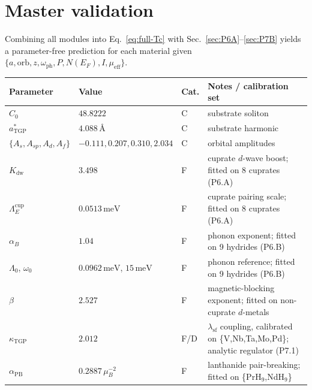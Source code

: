 \documentclass[11pt,a4paper]{article}
\newcommand{\lamsf}{\lambda_{\mathrm{sf}}}
\newcommand{\meV}{\,\mathrm{meV}}
\newcommand{\LamE}{\Lambda_{E}}
\begin{document}
\section{Master validation}\label{sec:master}

Combining all modules into Eq.~\eqref{eq:full-Tc} with
Sec.~\ref{sec:P6A}--\ref{sec:P7B} yields a parameter-free prediction for
each material given $\{a,\mathrm{orb},z,\omega_{\mathrm{ph}},P,N(E_{F}),I,\mu_{\mathrm{eff}}\}$.

\begin{center}\small
{}
\label{tab:params}
\begin{tabular}{@{}llll@{}}
\toprule
Parameter & Value & Cat. & Notes / calibration set\\
\midrule
$C_{0}$                 & $48.8222$           & \textsf{C} & substrate soliton \cite{TGP-core}\\
$a^{\ast}_{\mathrm{TGP}}$ & $4.088$\,\AA       & \textsf{C} & substrate harmonic \cite{TGP-core}\\
$\{A_{s},A_{sp},A_{d},A_{f}\}$
                        & $-0.111,0.207,0.310,2.034$
                                              & \textsf{C} & orbital amplitudes \cite{TGP-core}\\
$K_{\mathrm{dw}}$       & $3.498$             & \textsf{F} & cuprate $d$-wave boost; fitted on 8 cuprates (P6.A)\\
$\LamE^{\mathrm{cup}}$  & $0.0513\meV$        & \textsf{F} & cuprate pairing scale; fitted on 8 cuprates (P6.A)\\
$\alpha_{B}$            & $1.04$              & \textsf{F} & phonon exponent; fitted on 9 hydrides (P6.B)\\
$\Lambda_{0}$, $\omega_{0}$ & $0.0962\meV$, $15\meV$
                                              & \textsf{F} & phonon reference; fitted on 9 hydrides (P6.B)\\
$\beta$                 & $2.527$             & \textsf{F} & magnetic-blocking exponent; fitted on non-cuprate $d$-metals\\
$\kappa_{\mathrm{TGP}}$ & $2.012$             & \textsf{F/D} & $\lamsf$ coupling, calibrated on \{V,Nb,Ta,Mo,Pd\}; analytic regulator (P7.1)\\
$\alpha_{\mathrm{PB}}$  & $0.2887\,\mu_{B}^{-2}$ & \textsf{F} & lanthanide pair-breaking; fitted on \{PrH$_{9}$,NdH$_{9}$\}\\
\bottomrule
\end{tabular}
\end{center}
\end{document}
